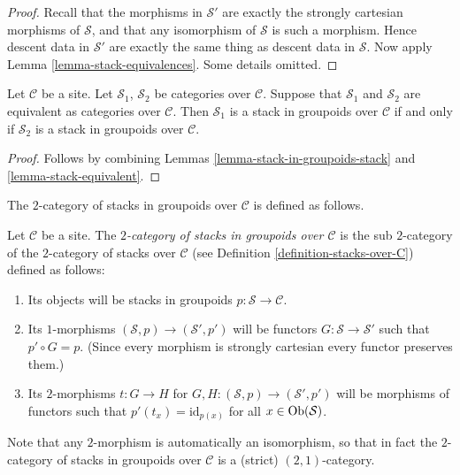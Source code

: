 \begin{proof}
Recall that the morphisms in $\mathcal{S}'$ are exactly the
strongly cartesian morphisms of $\mathcal{S}$, and that any isomorphism of
$\mathcal{S}$ is such a morphism. Hence descent data in $\mathcal{S}'$
are exactly the same thing as descent data in $\mathcal{S}$. Now apply
Lemma \ref{lemma-stack-equivalences}. Some details omitted.
\end{proof}

\begin{lemma}
\label{lemma-stack-in-groupoids-equivalent}
Let $\mathcal{C}$ be a site.
Let $\mathcal{S}_1$, $\mathcal{S}_2$ be categories over $\mathcal{C}$.
Suppose that $\mathcal{S}_1$ and $\mathcal{S}_2$ are equivalent
as categories over $\mathcal{C}$.
Then $\mathcal{S}_1$ is a stack in groupoids over $\mathcal{C}$ if and only if
$\mathcal{S}_2$ is a stack in groupoids over $\mathcal{C}$.
\end{lemma}

\begin{proof}
Follows by combining
Lemmas \ref{lemma-stack-in-groupoids-stack} and \ref{lemma-stack-equivalent}.
\end{proof}

\noindent
The $2$-category of stacks in groupoids over $\mathcal{C}$
is defined as follows.

\begin{definition}
\label{definition-stacks-in-groupoids-over-C}
Let $\mathcal{C}$ be a site.
The {\it $2$-category of stacks in groupoids over $\mathcal{C}$}
is the sub $2$-category of the $2$-category of stacks
over $\mathcal{C}$ (see Definition \ref{definition-stacks-over-C})
defined as follows:
\begin{enumerate}
\item Its objects will be stacks in groupoids
$p : \mathcal{S} \to \mathcal{C}$.
\item Its $1$-morphisms $(\mathcal{S}, p) \to (\mathcal{S}', p')$
will be functors $G : \mathcal{S} \to \mathcal{S}'$ such that
$p' \circ G = p$. (Since every morphism is strongly cartesian
every functor preserves them.)
\item Its $2$-morphisms $t : G \to H$ for
$G, H : (\mathcal{S}, p) \to (\mathcal{S}', p')$
will be morphisms of functors
such that $p'(t_x) = \text{id}_{p(x)}$
for all $x \in \mathop{\mathrm{Ob}}\nolimits(\mathcal{S})$.
\end{enumerate}
\end{definition}

\noindent
Note that any $2$-morphism is automatically an isomorphism, so
that in fact the $2$-category of stacks in groupoids over $\mathcal{C}$
is a (strict) $(2, 1)$-category.

